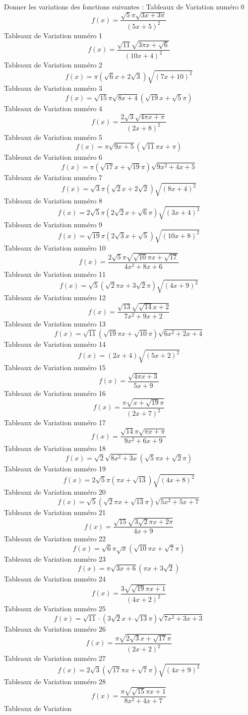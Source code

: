 \documentclass{article}
\begin{document}
 Donner les variations des fonctions suivantes : 
Tableaux de Variation num\'ero 0 \[f(x) = \frac{\sqrt{5} \pi \sqrt{3 x + 3 \pi}}{\left(5 x + 5\right)^{2}}\]Tableaux de Variation num\'ero 1 \[f(x) = \frac{\sqrt{11} \sqrt{3 \pi x + \sqrt{6}}}{\left(10 x + 4\right)^{2}}\]Tableaux de Variation num\'ero 2 \[f(x) = \pi \left(\sqrt{6} x + 2 \sqrt{3}\right) \sqrt{\left(7 x + 10\right)^{2}}\]Tableaux de Variation num\'ero 3 \[f(x) = \sqrt{15} \pi \sqrt{8 x + 4} \left(\sqrt{19} x + \sqrt{5} \pi\right)\]Tableaux de Variation num\'ero 4 \[f(x) = \frac{2 \sqrt{3} \sqrt{4 \pi x + \pi}}{\left(2 x + 8\right)^{2}}\]Tableaux de Variation num\'ero 5 \[f(x) = \pi \sqrt{9 x + 5} \left(\sqrt{11} \pi x + \pi\right)\]Tableaux de Variation num\'ero 6 \[f(x) = \pi \left(\sqrt{17} x + \sqrt{19} \pi\right) \sqrt{9 x^{2} + 4 x + 5}\]Tableaux de Variation num\'ero 7 \[f(x) = \sqrt{3} \pi \left(\sqrt{2} x + 2 \sqrt{2}\right) \sqrt{\left(8 x + 4\right)^{2}}\]Tableaux de Variation num\'ero 8 \[f(x) = 2 \sqrt{5} \pi \left(2 \sqrt{2} x + \sqrt{6} \pi\right) \sqrt{\left(3 x + 4\right)^{2}}\]Tableaux de Variation num\'ero 9 \[f(x) = \sqrt{19} \pi \left(2 \sqrt{3} x + \sqrt{5}\right) \sqrt{\left(10 x + 8\right)^{2}}\]Tableaux de Variation num\'ero 10 \[f(x) = \frac{2 \sqrt{5} \pi \sqrt{\sqrt{10} \pi x + \sqrt{17}}}{4 x^{2} + 8 x + 6}\]Tableaux de Variation num\'ero 11 \[f(x) = \sqrt{5} \left(\sqrt{2} \pi x + 3 \sqrt{2} \pi\right) \sqrt{\left(4 x + 9\right)^{2}}\]Tableaux de Variation num\'ero 12 \[f(x) = \frac{\sqrt{13} \sqrt{\sqrt{14} x + 2}}{7 x^{2} + 9 x + 2}\]Tableaux de Variation num\'ero 13 \[f(x) = \sqrt{11} \left(\sqrt{19} \pi x + \sqrt{10} \pi\right) \sqrt{6 x^{2} + 2 x + 4}\]Tableaux de Variation num\'ero 14 \[f(x) = \left(2 x + 4\right) \sqrt{\left(5 x + 2\right)^{2}}\]Tableaux de Variation num\'ero 15 \[f(x) = \frac{\sqrt{4 \pi x + 3}}{5 x + 9}\]Tableaux de Variation num\'ero 16 \[f(x) = \frac{\pi \sqrt{x + \sqrt{19} \pi}}{\left(2 x + 7\right)^{2}}\]Tableaux de Variation num\'ero 17 \[f(x) = \frac{\sqrt{14} \pi \sqrt{\pi x + \pi}}{9 x^{2} + 6 x + 9}\]Tableaux de Variation num\'ero 18 \[f(x) = \sqrt{2} \sqrt{8 x^{2} + 3 x} \left(\sqrt{5} \pi x + \sqrt{2} \pi\right)\]Tableaux de Variation num\'ero 19 \[f(x) = 2 \sqrt{5} \pi \left(\pi x + \sqrt{13}\right) \sqrt{\left(4 x + 8\right)^{2}}\]Tableaux de Variation num\'ero 20 \[f(x) = \sqrt{5} \left(\sqrt{2} \pi x + \sqrt{13} \pi\right) \sqrt{5 x^{2} + 5 x + 7}\]Tableaux de Variation num\'ero 21 \[f(x) = \frac{\sqrt{15} \sqrt{3 \sqrt{2} \pi x + 2 \pi}}{4 x + 9}\]Tableaux de Variation num\'ero 22 \[f(x) = \sqrt{6} \pi \sqrt{x} \left(\sqrt{10} \pi x + \sqrt{7} \pi\right)\]Tableaux de Variation num\'ero 23 \[f(x) = \pi \sqrt{3 x + 6} \left(\pi x + 3 \sqrt{2}\right)\]Tableaux de Variation num\'ero 24 \[f(x) = \frac{3 \sqrt{\sqrt{19} \pi x + 1}}{\left(4 x + 2\right)^{2}}\]Tableaux de Variation num\'ero 25 \[f(x) = \sqrt{11} \cdot \left(3 \sqrt{2} x + \sqrt{13} \pi\right) \sqrt{7 x^{2} + 3 x + 3}\]Tableaux de Variation num\'ero 26 \[f(x) = \frac{\pi \sqrt{2 \sqrt{3} x + \sqrt{17} \pi}}{\left(2 x + 2\right)^{2}}\]Tableaux de Variation num\'ero 27 \[f(x) = 2 \sqrt{3} \left(\sqrt{17} \pi x + \sqrt{7} \pi\right) \sqrt{\left(4 x + 9\right)^{2}}\]Tableaux de Variation num\'ero 28 \[f(x) = \frac{\pi \sqrt{\sqrt{15} \pi x + 1}}{8 x^{2} + 4 x + 7}\]Tableaux de Variation 
\end{document}
